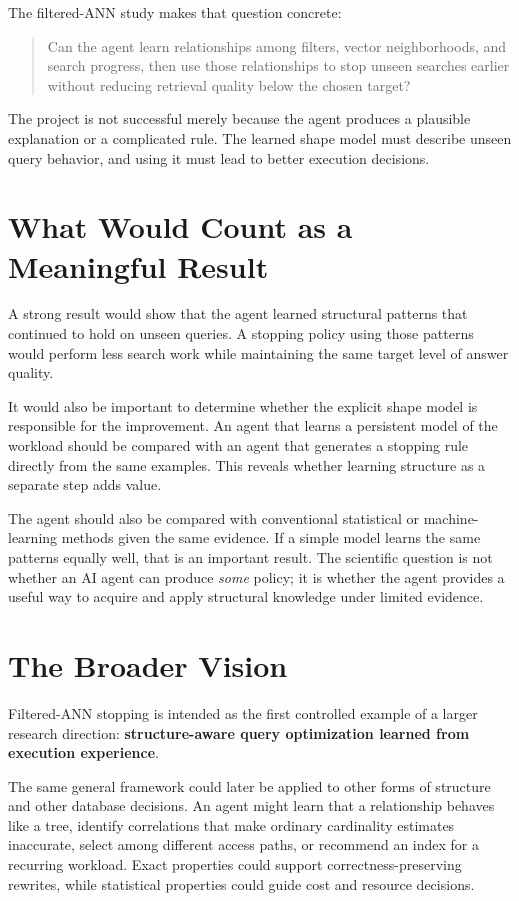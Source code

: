 \documentclass[11pt]{article}
\begin{document}
The filtered-ANN study makes that question concrete:

\begin{quote}
Can the agent learn relationships among filters, vector neighborhoods, and search progress, then use those relationships to stop unseen searches earlier without reducing retrieval quality below the chosen target?
\end{quote}

The project is not successful merely because the agent produces a plausible explanation or a complicated rule. The learned shape model must describe unseen query behavior, and using it must lead to better execution decisions.

\section{What Would Count as a Meaningful Result}

A strong result would show that the agent learned structural patterns that continued to hold on unseen queries. A stopping policy using those patterns would perform less search work while maintaining the same target level of answer quality.

It would also be important to determine whether the explicit shape model is responsible for the improvement. An agent that learns a persistent model of the workload should be compared with an agent that generates a stopping rule directly from the same examples. This reveals whether learning structure as a separate step adds value.

The agent should also be compared with conventional statistical or machine-learning methods given the same evidence. If a simple model learns the same patterns equally well, that is an important result. The scientific question is not whether an AI agent can produce \emph{some} policy; it is whether the agent provides a useful way to acquire and apply structural knowledge under limited evidence.

\section{The Broader Vision}

Filtered-ANN stopping is intended as the first controlled example of a larger research direction: \textbf{structure-aware query optimization learned from execution experience}.

The same general framework could later be applied to other forms of structure and other database decisions. An agent might learn that a relationship behaves like a tree, identify correlations that make ordinary cardinality estimates inaccurate, select among different access paths, or recommend an index for a recurring workload. Exact properties could support correctness-preserving rewrites, while statistical properties could guide cost and resource decisions.
\end{document}
